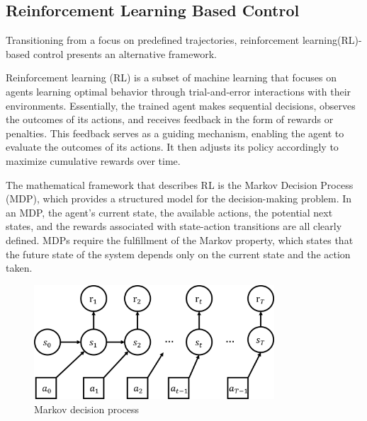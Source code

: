 
\subsection{Reinforcement Learning Based Control}
Transitioning from a focus on predefined trajectories, reinforcement learning(RL)-based control presents an alternative framework.

Reinforcement learning (RL)\cite{sutton2018reinforcement} is a subset of machine learning that focuses on agents learning optimal behavior through trial-and-error interactions with their environments. Essentially, the trained agent makes sequential decisions, observes the outcomes of its actions, and receives feedback in the form of rewards or penalties. This feedback serves as a guiding mechanism, enabling the agent to evaluate the outcomes of its actions. It then adjusts its policy accordingly to maximize cumulative rewards over time.

The mathematical framework that describes RL is the Markov Decision Process (MDP)\cite{puterman1990markov}, which provides a structured model for the decision-making problem. In an MDP, the agent's current state, the available actions, the potential next states, and the rewards associated with state-action transitions are all clearly defined. MDPs require the fulfillment of the Markov property, which states that the future state of the system depends only on the current state and the action taken.

\begin{figure}[h]
    \centering
    \includegraphics[width=0.8\textwidth]{figures/MDP.png}
    \caption{Markov decision process}
    \label{fig:mdp}
\end{figure}

